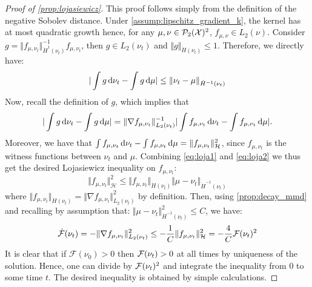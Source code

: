 \begin{proof}[Proof of \cref{prop:lojasiewicz}]\label{proof:prop:lojasiewicz}
	This proof follows simply from the definition of the negative Sobolev distance. Under \cref{assump:lipschitz_gradient_k}, the kernel has at most quadratic growth hence, for any $\mu,\nu \in \mathcal{P}_2({{\mathcal X}})^2$, $f_{\mu,\nu}\in L_2(\nu)$. Consider $g = \Vert f_{\mu, \nu_t}\Vert^{-1}_{\dot{H}^1(\nu_t)} f_{\mu, \nu_t}$, then $g\in L_2(\nu_t)$ and $\Vert g \Vert_{\dot{H}(\nu_t)}\leq 1$. Therefore, we directly have:
	\begin{align}\label{eq:loja1}
	\vert \int g \mathop{}\!\mathrm{d} \nu_t - \int g \mathop{}\!\mathrm{d} \mu  \vert \leq \Vert \nu_t - \mu\Vert_{\dot{H}^{-1}(\nu_t)} 
	\end{align}
	Now, recall the definition of $g$, which implies that
	\begin{equation}\label{eq:loja2}
	\vert \int g \mathop{}\!\mathrm{d} \nu_t - \int g \mathop{}\!\mathrm{d} \mu  \vert = \Vert \nabla f_{\mu, \nu_t}\Vert^{-1}_{L_2(\nu_t)} \vert \int f_{\mu, \nu_t}\mathop{}\!\mathrm{d} \nu_t-\int f_{\mu, \nu_t} \mathop{}\!\mathrm{d} \mu \vert.
	\end{equation}
	Moreover,  we have that $\int f_{\mu, \nu_t}\mathop{}\!\mathrm{d} \nu_t-\int f_{\mu,\nu_t}\mathop{}\!\mathrm{d} \mu = \Vert f_{\mu, \nu_t}\Vert^2_{{{\mathcal H}}}$, since $f_{\mu, \nu_t}$  is the witness functions between $\nu_t$ and $\mu$. Combining \eqref{eq:loja1} and \eqref{eq:loja2} we thus get the desired Lojasiewicz inequality on $f_{\mu,\nu_t}$:
	\begin{equation}
	\Vert f_{\mu,\nu_t} \Vert^2_{\mathcal{H}} \leq \Vert f_{\mu,\nu_t} \Vert_{\dot{H}(\nu_t)} \Vert  \mu -\nu_t\Vert_{\dot{H}^{-1}(\nu_t)}  
	\end{equation}
	where $\Vert f_{\mu,\nu_t} \Vert_{\dot{H}(\nu_t)}=\Vert \nabla f_{\mu, \nu_t} \Vert^2_{L_2(\nu_t)}$ by definition. Then, 
	using \cref{prop:decay_mmd} and recalling by assumption that: $\Vert \mu - \nu_t \Vert^2_{\dot{H}^{-1}(\nu_t)} \le C$, we have:  
	\begin{align}\label{eq:PL_inequality}
	\dot{{{\mathcal F}}}(\nu_t) = - \Vert \nabla f_{\mu, \nu_t} \Vert^2_{L_2(\nu_t)} \leq -\frac{1}{C}\Vert f_{\mu,\nu_t} \Vert^2_{\mathcal{H}}= -\frac{4}{C}{{\mathcal F}}(\nu_t)^2	
	\end{align}
	It is clear that if $\mathcal{F}(\nu_0)>0$ then ${{\mathcal F}}(\nu_t)>0$ at all times by uniqueness of the solution. Hence, one can divide by ${{\mathcal F}}(\nu_t)^2$ and integrate the inequality from $0$ to some time $t$. The desired inequality is obtained by simple calculations.
\end{proof}

